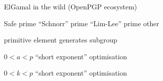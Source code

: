 \documentclass[aspectratio=169]{beamer}
\begin{document}

\begin{frame}{ElGamal in the wild (OpenPGP ecosystem)}
  \large
  \begin{description}[leftmargin=8cm]
    \setlength{\itemsep}{2em}
  \item[Large prime $p$] \hfill Safe prime \hfill ``Schnorr'' prime
    \hfill ``Lim-Lee'' prime \hfill other \hfill\strut
  \item[Generator $\alpha$] \hfill primitive element \hfill generates
    subgroup \hfill\strut
  \item[Private key] \hfill $0 < a < p$ \hfill ``short exponent'' optimisation \hfill\strut
  \item[Ephemeral key] \hfill $0 < k < p$ \hfill ``short exponent'' optimisation \hfill\strut
  \end{description}
\end{frame}

\end{document}
